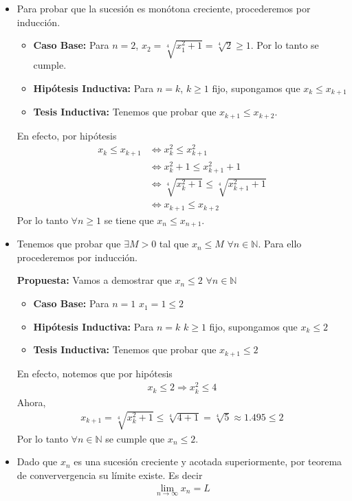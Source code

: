\documentclass[12pt]{book}
\begin{document}
\begin{itemize}
    \item[\textbf{a)}] Para probar que la sucesión es monótona creciente, procederemos por inducción.

    \begin{itemize}
        \item \textbf{Caso Base:} Para $n=2$, $x_2=\sqrt[4]{x_1^2+1}=\sqrt[4]{2}\geq 1$. Por lo tanto se cumple.

        \item \textbf{Hipótesis Inductiva:} Para $n=k$, $k\geq 1$ fijo, supongamos que $x_k \leq x_{k+1}$

        \item \textbf{Tesis Inductiva:} Tenemos que probar que $x_{k+1} \leq x_{k+2}$.
    \end{itemize}
    En efecto, por hipótesis 
    \begin{align*}
        x_k \leq x_{k+1} &\Longleftrightarrow x_k^2 \leq x_{k+1}^2 \\
        &\Longleftrightarrow x_k^2+1 \leq x_{k+1}^2 +1\\ 
         &\Longleftrightarrow \sqrt[4]{x_k^2+1} \leq \sqrt[4]{x_{k+1}^2 +1} \\
          &\Longleftrightarrow x_{k+1} \leq x_{k+2}
    \end{align*}
    Por lo tanto $\forall n \geq 1$ se tiene que $x_n \leq x_{n+1}$.
    
    \item[\textbf{b)}] Tenemos que probar que $\exists M >0$ tal que $x_n \leq M$ $\forall n \in \mathbb{N}$. Para ello procederemos por inducción.

    \textbf{Propuesta:} Vamos a demostrar que $x_n \leq 2$ $\forall n \in \mathbb{N}$

    \begin{itemize}
        \item \textbf{Caso Base:} Para $n=1$ $x_1=1 \leq 2$

        \item \textbf{Hipótesis Inductiva:} Para $n=k$ $k\geq 1$ fijo, supongamos que $x_k \leq 2$

        \item \textbf{Tesis Inductiva:} Tenemos que probar que $x_{k+1} \leq 2$
    \end{itemize}
    En efecto, notemos que por hipótesis
    \begin{align*}
        x_k  \leq 2 \Longrightarrow x_k^2 \leq 4
    \end{align*}
    Ahora, 
    \begin{align*}
        x_{k+1}= \sqrt[4]{x_k^2+1} \leq \sqrt[4]{4+1}=\sqrt[4]{5}\approx 1.495 \leq 2
    \end{align*}
    Por lo tanto $\forall n \in \mathbb{N}$ se cumple que $x_n \leq 2$.
    \item[\textbf{c)}] Dado que $x_n$ es una sucesión creciente y acotada superiormente, por teorema de conververgencia su límite existe. Es decir 
    \begin{align*}
        \lim_{n \to \infty} x_n = L
    \end{align*}
    

\end{itemize}
\end{document}
